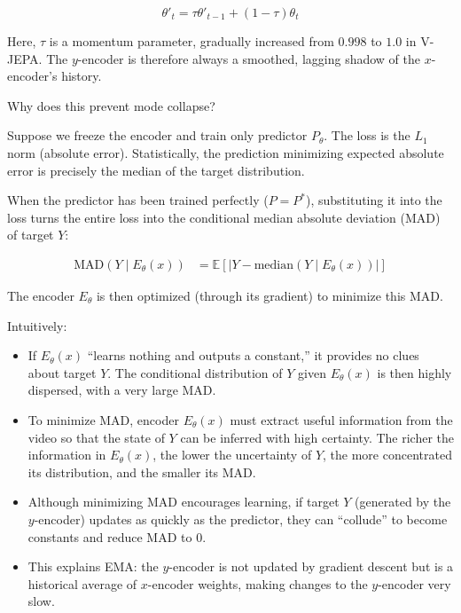 \[
\theta'_t=\tau\theta'_{t-1}+(1-\tau)\theta_t
\]

Here, \(\tau\) is a momentum parameter, gradually increased from \(0.998\) to \(1.0\) in V-JEPA. The \(y\)-encoder is therefore always a smoothed, lagging shadow of the \(x\)-encoder's history.

Why does this prevent mode collapse?

Suppose we freeze the encoder and train only predictor \(P_\theta\). The loss is the \(L_1\) norm (absolute error). Statistically, the prediction minimizing expected absolute error is precisely the median of the target distribution.

When the predictor has been trained perfectly (\(P=P^{*}\)), substituting it into the loss turns the entire loss into the conditional median absolute deviation (MAD) of target \(Y\):

\[
\begin{aligned}
\mathrm{MAD}(Y\mid E_\theta(x))
&=
\mathbb{E}
\left[
\left|
Y-\mathrm{median}(Y\mid E_\theta(x))
\right|
\right]
\end{aligned}
\]

The encoder \(E_\theta\) is then optimized (through its gradient) to minimize this MAD.

Intuitively:

\begin{itemize}
\tightlist
\item
  If \(E_\theta(x)\) ``learns nothing and outputs a constant,'' it provides no clues about target \(Y\). The conditional distribution of \(Y\) given \(E_\theta(x)\) is then highly dispersed, with a very large MAD.
\item
  To minimize MAD, encoder \(E_\theta(x)\) must extract useful information from the video so that the state of \(Y\) can be inferred with high certainty. The richer the information in \(E_\theta(x)\), the lower the uncertainty of \(Y\), the more concentrated its distribution, and the smaller its MAD.
\item
  Although minimizing MAD encourages learning, if target \(Y\) (generated by the \(y\)-encoder) updates as quickly as the predictor, they can ``collude'' to become constants and reduce MAD to \(0\).
\item
  This explains EMA: the \(y\)-encoder is not updated by gradient descent but is a historical average of \(x\)-encoder weights, making changes to the \(y\)-encoder very slow.
\end{itemize}

